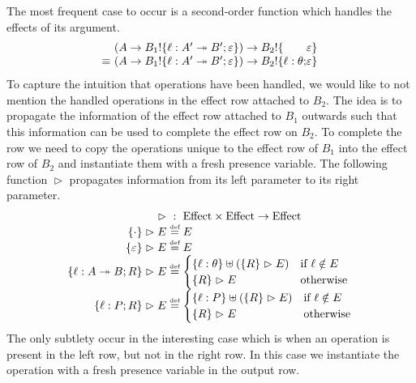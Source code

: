 \documentclass[12pt,phd,lfcs,twoside,openright,logo,leftchapter,normalheadings]{infthesis}
\theoremstyle{plain}
\theoremstyle{definition}
\begin{document}
The most frequent case to occur is a second-order function which
handles the effects of its argument.
%
\[
  \ba{@{~}l@{~}l@{}l}
        & (A \to B_1 \eff \{\ell : A' \opto B';\varepsilon\}) \to B_2 \eff \{              &\varepsilon\}\\
  \equiv& (A \to B_1 \eff \{\ell : A' \opto B';\varepsilon\}) \to B_2 \eff \{\ell : \theta;&\varepsilon\}
  \ea
\]
%
To capture the intuition that operations have been handled, we would
like to not mention the handled operations in the effect row attached
to $B_2$.
%
The idea is to propagate the information of the effect row attached to
$B_1$ outwards such that this information can be used to complete the
effect row on $B_2$. To complete the row we need to copy the
operations unique to the effect row of $B_1$ into the effect row of
$B_2$ and instantiate them with a fresh presence variable.
%
The following function $\vartriangleright$ propagates information from
its left parameter to its right parameter.
%
\[
\ba{@{~}r@{~}c@{~}l}
  \vartriangleright &:& \EffectCat \times \EffectCat \to \EffectCat\\
  \{\cdot\} \vartriangleright E &\defas& E\\
  \{\varepsilon\} \vartriangleright E &\defas& E\\
  \{\ell : A \opto B;R\} \vartriangleright E &\defas&
  \begin{cases}
    \{\ell : \theta\} \uplus (\{R\} \vartriangleright E) & \text{if } \ell \notin E\\
    \{R\} \vartriangleright E & \text{otherwise}
  \end{cases}\\
  \{\ell : P;R\} \vartriangleright E &\defas&
  \begin{cases}
    \{\ell : P\} \uplus (\{R\} \vartriangleright E) & \text{if } \ell \notin E\\
    \{R\} \vartriangleright E & \text{otherwise}
  \end{cases}
\ea
\]
%
The only subtlety occur in the interesting case which is when an
operation is present in the left row, but not in the right row. In
this case we instantiate the operation with a fresh presence variable
in the output row.
\end{document}
